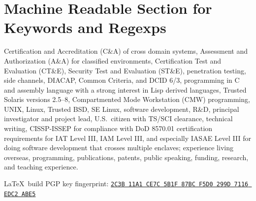 \documentclass[12pt,twoside,letterpaper]{article}
\begin{document}
\vspace{-8mm}
\section*{Machine Readable Section for Keywords and Regexps}
\vspace{-2mm}

Certification and Accreditation (C\&A) of cross domain systems,
Assessment and Authorization (A\&A) for classified environments,
Certification Test and Evaluation (CT\&E), Security Test and Evaluation (ST\&E),
penetration testing, side channels,
DIACAP, Common Criteria, and DCID 6/3,
programming in C and assembly language with a strong interest in Lisp derived languages,
Trusted Solaris versions 2.5--8, Compartmented Mode Workstation (CMW) programming,
UNIX, Linux, Trusted BSD, SE Linux,
software development,
R\&D,
principal investigator and project lead,
U.S.\ citizen with TS/SCI clearance,
technical writing,
CISSP-ISSEP for compliance with DoD 8570.01 certification requirements
	for IAT Level III, IAM Level III, and especially IASAE Level III
	for doing software development that crosses multiple enclaves;
experience living overseas,
programming,
publications,
patents,
public speaking,
funding,
research,
and teaching experience.

\vfill
{\noindent\tiny \LaTeX\ build }
\hfill
PGP key fingerprint:
\href{http://call-with-current-continuation.com/Joe.Loughry.txt}%
{\texttt{2C3B 11A1 CE7C 5B1F 87BC  F5D0 299D 7116 EDC2 ABE5}}
\end{document}
